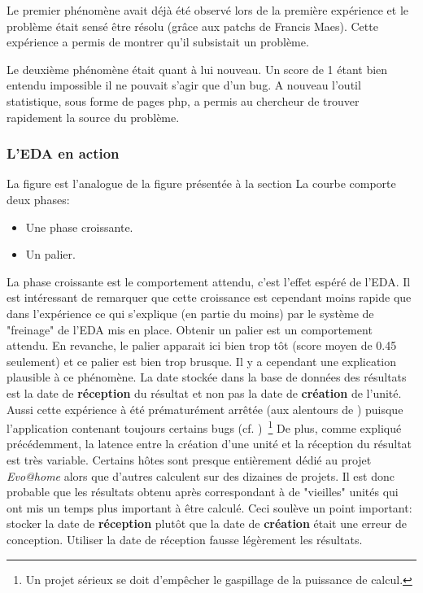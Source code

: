 \documentclass[a4paper, 11pt]{report}
\begin{document}
Le premier phénomène avait déjà été observé lors de la première expérience et le problème était sensé être résolu (grâce aux patchs de Francis Maes). Cette expérience a permis de montrer qu'il subsistait un problème.

Le deuxième phénomène était quant à lui nouveau. Un score de 1 étant bien entendu impossible il ne pouvait s'agir que d'un bug. A nouveau l'outil statistique, sous forme de pages php, a permis au chercheur de trouver rapidement la source du problème.


\subsubsection{L'EDA en action}
La figure %
est l'analogue de la figure %
présentée à la section %
La courbe comporte deux phases:
\begin{itemize}
\item Une phase croissante.
\item Un palier.
\end{itemize}
La phase croissante est le comportement attendu, c'est l'effet espéré de l'EDA. Il est intéressant de remarquer que cette croissance est cependant moins rapide que dans l'expérience ce qui s'explique (en partie du moins) par le système de "freinage" de l'EDA mis en place. %
Obtenir un palier est un comportement attendu. En revanche, le palier apparait ici bien trop tôt (score moyen de 0.45 seulement) et ce palier est bien trop brusque. Il y a cependant une explication plausible à ce phénomène. La date stockée dans la base de données des résultats est la date de \textbf{réception} du résultat et non pas la date de \textbf{création} de l'unité. Aussi cette expérience à été prématurément arrêtée (aux alentours de )%
puisque l'application contenant toujours certains bugs (cf. )~\footnote{Un projet sérieux se doit d'empêcher le gaspillage de la puissance de calcul.} %
De plus, comme expliqué précédemment, la latence entre la création d'une unité et la réception du résultat est très variable. Certains hôtes sont presque entièrement dédié au projet \textit{Evo@home} alors que d'autres calculent sur des dizaines de projets. Il est donc probable que les résultats obtenu après %
correspondant à de "vieilles" unités qui ont mis un temps plus important à être calculé. Ceci soulève un point important: stocker la date de \textbf{réception} plutôt que la date de \textbf{création} était une erreur de conception. Utiliser la date de réception fausse légèrement les résultats.
\end{document}
